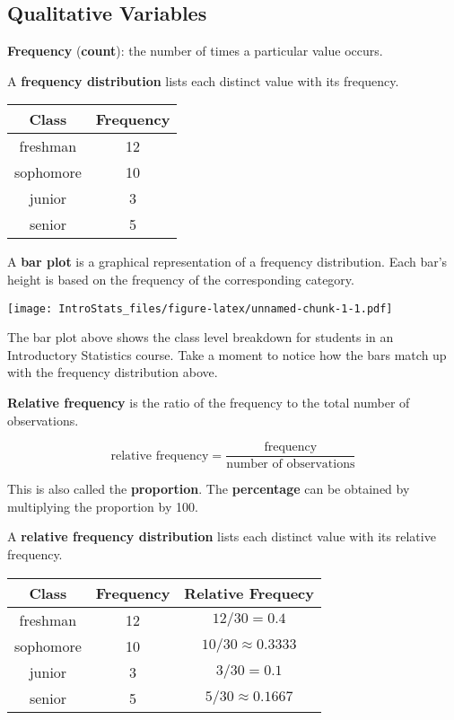 \documentclass[
]{book}
\begin{document}
\hypertarget{qualitative-variables}{%
\subsection{Qualitative Variables}\label{qualitative-variables}}

\textbf{Frequency} (\textbf{count}): the number of times a particular value occurs.

A \textbf{frequency distribution} lists each distinct value with its frequency.

\begin{longtable}[]{@{}cc@{}}
\toprule
Class & Frequency \\
\midrule
\endhead
freshman & 12 \\
sophomore & 10 \\
junior & 3 \\
senior & 5 \\
\bottomrule
\end{longtable}

A \textbf{bar plot} is a graphical representation of a frequency distribution. Each bar's height is based on the frequency of the corresponding category.

\texttt{[image: IntroStats\_files/figure-latex/unnamed-chunk-1-1.pdf]}

The bar plot above shows the class level breakdown for students in an Introductory Statistics course. Take a moment to notice how the bars match up with the frequency distribution above.

\textbf{Relative frequency} is the ratio of the frequency to the total number of observations.

\[
  \text{relative frequency} = \frac{\text{frequency}}{\text{number of observations}}
\]

This is also called the \textbf{proportion}. The \textbf{percentage} can be obtained by multiplying the proportion by 100.

A \textbf{relative frequency distribution} lists each distinct value with its relative frequency.

\begin{longtable}[]{@{}ccc@{}}
\toprule
Class & Frequency & Relative Frequecy \\
\midrule
\endhead
freshman & 12 & \(12/30 = 0.4\) \\
sophomore & 10 & \(10/30 \approx 0.3333\) \\
junior & 3 & \(3/30 = 0.1\) \\
senior & 5 & \(5/30 \approx 0.1667\) \\
\bottomrule
\end{longtable}
\end{document}
